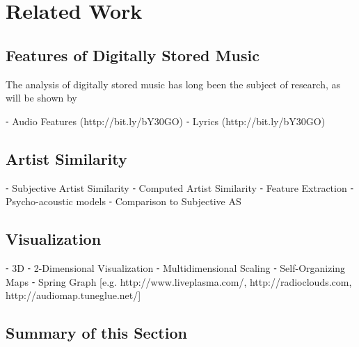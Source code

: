 \section{Related Work}

\subsection{Features of Digitally Stored Music}

The analysis of digitally stored music has long been the subject of research, as will
be shown by 

⁃	Audio Features (http://bit.ly/bY30GO)
⁃	Lyrics (http://bit.ly/bY30GO)

\subsection{Artist Similarity}

⁃	Subjective Artist Similarity
⁃	Computed Artist Similarity
⁃	Feature Extraction
⁃	Psycho-acoustic models
⁃	Comparison to Subjective AS

\subsection{Visualization}

⁃	3D
⁃	2-Dimensional Visualization
⁃	Multidimensional Scaling
⁃	Self-Organizing Maps
⁃	Spring Graph
[e.g. http://www.liveplasma.com/, http://radioclouds.com, http://audiomap.tuneglue.net/]

\subsection{Summary of this Section}